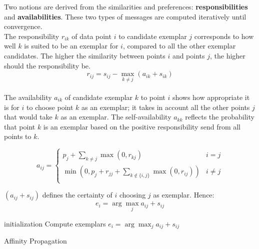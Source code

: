 \documentclass{ipol}
\begin{document}
Two notions are derived from the similarities and preferences:
\textbf{responsibilities} and \textbf{availabilities}. These two types of
messages are computed iteratively until convergence.
\\
The responsibility $r_{ik}$ of data point $i$ to
candidate exemplar $j$ corresponds to how well $k$ is suited to be an exemplar
for $i$, compared to all the other exemplar candidates. The higher the
similarity between points $i$ and points $j$, the higher should the
responsibility be.
\begin{equation*}
r_{ij} = s_{ij} - \max_{k \neq j} (a_{ik} + s_{ik})
\end{equation*}
\\
The availability $a_{ik}$ of candidate exemplar $k$ to point $i$ shows how
appropriate it is for $i$ to choose point $k$ as an exemplar; it takes in account
all the other points $j$ that would take $k$ as an exemplar. The
self-availability $a_{kk}$ reflects the probability that point $k$ is an
exemplar based on the positive responsibility send from all points to $k$.

\begin{equation*}
a_{ij} = \begin{cases}
	    p_j + \sum_{k \neq j} \max(0, r_{kj}) &  i = j \\
	    \min ( 0, p_j + r_{jj} + \sum_{k \notin \{i, j\} } \max (0, r_{ij}))
	    & i \neq j\\
	 \end{cases}
\end{equation*}

$(a_{ij} + s_{ij})$ defines the certainty of $i$ choosing $j$ as exemplar.
Hence:
\begin{equation*}
e_i = \arg \max_j a_{ij} + s_{ij}
\end{equation*}

\begin{algorithm}[H]
  \SetLine
  initialization\;
  Compute exemplars $e_i = \arg \max_{j} a_{ij} + s_{ij}$ \;
  \caption{Affinity Propagation}
\end{algorithm}
\end{document}
